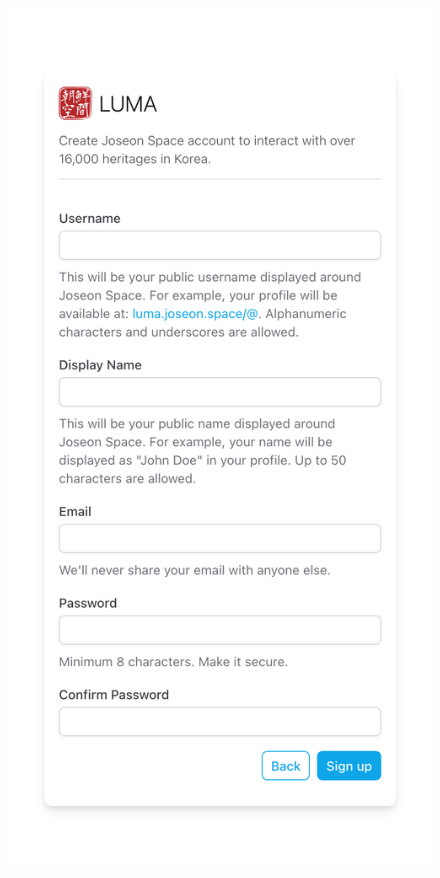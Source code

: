 \documentclass[conference]{IEEEtran}
\begin{document}
\begin{figure}[h]
    \centering
    \begin{minipage}{0.49\linewidth}
        \centering
        \includegraphics[width=\linewidth]{media/v1.png}

\end{minipage}
\end{figure}
\end{document}
